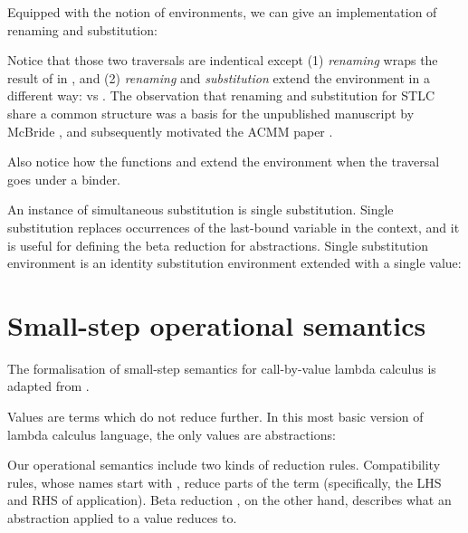 \documentclass[bsc,frontabs,oneside,singlespacing,parskip,deptreport]{infthesis}
\theoremstyle{definition}
\theoremstyle{lemma}
\begin{document}
Equipped with the notion of environments, we can give an
implementation of renaming and substitution:


Notice that those two traversals are indentical except (1)
\textit{renaming} wraps the result of  in , and (2)
\textit{renaming} and \textit{substitution} extend the environment in
a different way:  vs . The observation that renaming and substitution for STLC share a
common structure was a basis for the unpublished manuscript by McBride
\cite{mcbride2005type}, and subsequently motivated the ACMM paper
\cite{DBLP:conf/cpp/Allais0MM17}. 

Also notice how the functions  and  extend the
environment when the traversal goes under a binder.

An instance of simultaneous substitution is single
substitution. Single substitution replaces occurrences of the
last-bound variable in the context, and it is useful for defining the
beta reduction for abstractions. Single substitution environment is an
identity substitution environment extended with a single value:



\section{Small-step operational semantics}

The formalisation of small-step semantics for call-by-value lambda
calculus is adapted from \cite{DBLP:conf/sbmf/Wadler18}.

Values are terms which do not reduce further. In this most basic
version of lambda calculus language, the only values are abstractions:


Our operational semantics include two kinds of reduction rules. Compatibility rules, whose
names start with , reduce parts of the term (specifically, the LHS
and RHS of application). Beta reduction , on the other hand,
describes what an abstraction applied to a value reduces to.

\end{document}
